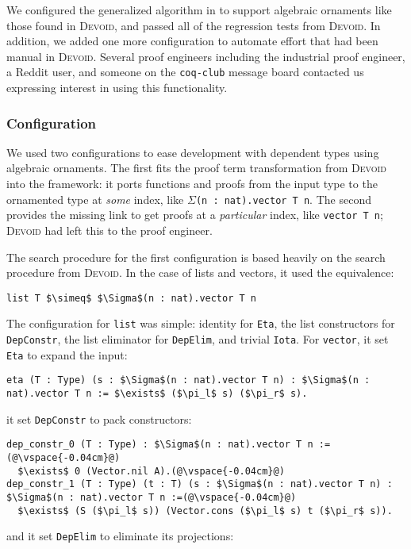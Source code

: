 We configured the generalized algorithm in \toolname to support algebraic ornaments like those found in \textsc{Devoid},
and passed all of the regression tests from \textsc{Devoid}.
In addition, we added one more configuration to automate effort that had been manual in \textsc{Devoid}.
Several proof engineers including the industrial proof engineer, a Reddit user,
and someone on the \lstinline{coq-club} message board contacted us expressing interest in using this functionality.

\subsubsection{Configuration}

We used two configurations to ease development with dependent types using algebraic ornaments.
The first fits the proof term transformation from \textsc{Devoid} into the \toolname framework:
it ports functions and proofs from the input type to the ornamented type at \textit{some} index,
like $\Sigma$\lstinline{(n : nat).vector T n}.
The second provides the missing link to get proofs at a \textit{particular} index, like \lstinline{vector T n};
\textsc{Devoid} had left this to the proof engineer.

The search procedure for the first configuration is based heavily on the search procedure from \textsc{Devoid}.
In the case of lists and vectors, it used the equivalence:

\begin{lstlisting}
list T $\simeq$ $\Sigma$(n : nat).vector T n
\end{lstlisting}
The configuration for \lstinline{list} was simple: identity for \lstinline{Eta},
the list constructors for \lstinline{DepConstr}, the list eliminator for \lstinline{DepElim},
and trivial \lstinline{Iota}.
For \lstinline{vector}, it set \lstinline{Eta} to expand the input:

\begin{lstlisting}[backgroundcolor=\color{cyan!30}]
eta (T : Type) (s : $\Sigma$(n : nat).vector T n) : $\Sigma$(n : nat).vector T n := $\exists$ ($\pi_l$ s) ($\pi_r$ s).
\end{lstlisting}
it set \lstinline{DepConstr} to pack constructors: %

\begin{lstlisting}[backgroundcolor=\color{cyan!30}]
dep_constr_0 (T : Type) : $\Sigma$(n : nat).vector T n :=(@\vspace{-0.04cm}@)
  $\exists$ 0 (Vector.nil A).(@\vspace{-0.04cm}@)
dep_constr_1 (T : Type) (t : T) (s : $\Sigma$(n : nat).vector T n) : $\Sigma$(n : nat).vector T n :=(@\vspace{-0.04cm}@)
  $\exists$ (S ($\pi_l$ s)) (Vector.cons ($\pi_l$ s) t ($\pi_r$ s)).
\end{lstlisting}
and it set \lstinline{DepElim} to eliminate its projections:

